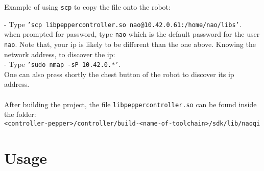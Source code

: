 \noindent Example of using \texttt{scp} to copy the file onto the robot:

- Type \texttt{'scp libpeppercontroller.so nao@10.42.0.61:/home/nao/libs'}.\\

\noindent when prompted for password, type \texttt{nao} which is the default password for the user \texttt{nao}.
Note that, your ip is likely to be different than the one above. Knowing the network address, to discover the ip:\\

- Type \texttt{'sudo nmap -sP 10.42.0.*'}.\\

\noindent One can also press shortly the chest button of the robot to discover its ip address.\\ \\
\noindent After building the project, the file
\texttt{libpeppercontroller.so} can be found inside the folder:\\
\texttt{<controller-pepper>/controller/build-<name-of-toolchain>/sdk/lib/naoqi}

\section{Usage}

